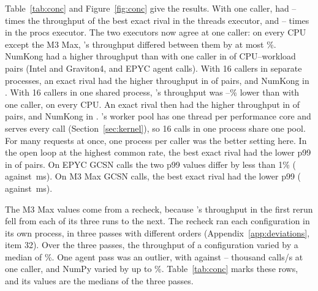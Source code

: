 Table~\ref{tab:conc} and Figure~\ref{fig:conc} give the results.
With one caller, \sweet had -- times the throughput of the best exact rival in the threads executor, and -- times in the procs executor.
The two executors now agree at one caller: on every CPU except the M3 Max, \sweet's throughput differed between them by at most \%.
NumKong had a higher throughput than \sweet with one caller in  of  CPU--workload pairs (Intel and Graviton4, and EPYC agent calls).
With 16 callers in separate processes, an exact rival had the higher throughput in  of  pairs, and NumKong in .
With 16 callers in one shared process, \sweet's throughput was --\% lower than with one caller, on every CPU.
An exact rival then had the higher throughput in  of  pairs, and NumKong in .
\sweet's worker pool has one thread per performance core and serves every call (Section~\ref{sec:kernel}), so 16 calls in one process share one pool.
For many requests at once, one process per caller was the better setting here.
In the open loop at the highest common rate, the best exact rival had the lower p99 in  of  pairs.
On EPYC GCSN calls the two p99 values differ by less than 1\% ( against \,ms).
On M3 Max GCSN calls, the best exact rival had the lower p99 ( against \,ms).

The M3 Max values come from a recheck, because \sweet's throughput in the first rerun fell from each of its three runs to the next.
The recheck ran each configuration in its own process, in three passes with different orders (Appendix~\ref{app:deviations}, item 32).
Over the three passes, the throughput of a configuration varied by a median of \%.
One \sweet agent pass was an outlier, with  against -- thousand calls/s at one caller, and NumPy varied by up to \%.
Table~\ref{tab:conc} marks these rows, and its values are the medians of the three passes.

